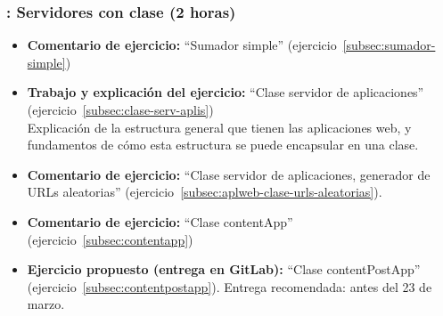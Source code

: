 \documentclass[a4paper,12pt]{article}
\begin{document}
\subsubsection{\martesE: Servidores con clase (2 horas)}
\label{cal:martesE}

\begin{itemize}
\item \textbf{Comentario de ejercicio:} ``Sumador simple'' (ejercicio~\ref{subsec:sumador-simple}) 
\item \textbf{Trabajo y explicación del ejercicio:} ``Clase servidor de aplicaciones'' (ejercicio~\ref{subsec:clase-serv-aplis}) \\
  Explicación de la estructura general que tienen las aplicaciones web, y fundamentos de cómo esta estructura se puede encapsular en una clase.
\item \textbf{Comentario de ejercicio:} ``Clase servidor de aplicaciones, generador de URLs aleatorias'' (ejercicio~\ref{subsec:aplweb-clase-urls-aleatorias}). 
 \item \textbf{Comentario de ejercicio:}  ``Clase contentApp'' (ejercicio~\ref{subsec:contentapp}) 
 \item \textbf{Ejercicio propuesto (entrega en GitLab):} ``Clase contentPostApp'' (ejercicio~\ref{subsec:contentpostapp}).
  Entrega recomendada: antes del 23 de marzo.
\end{itemize}



\end{document}
